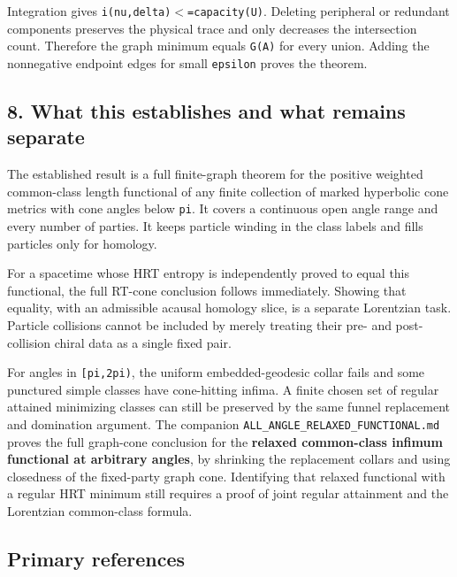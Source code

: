 \documentclass[11pt]{article}
\renewcommand{\textless}{\ensuremath{<}}
\begin{document}
Integration gives \texttt{i(nu,delta)\textless{}=capacity(U)}. Deleting
peripheral or redundant components preserves the physical trace and only
decreases the intersection count. Therefore the graph minimum equals
\texttt{G(A)} for every union. Adding the nonnegative endpoint edges for
small \texttt{epsilon} proves the theorem.

\subsection{8. What this establishes and what remains
separate}\label{what-this-establishes-and-what-remains-separate}

The established result is a full finite-graph theorem for the positive
weighted common-class length functional of any finite collection of
marked hyperbolic cone metrics with cone angles below \texttt{pi}. It
covers a continuous open angle range and every number of parties. It
keeps particle winding in the class labels and fills particles only for
homology.

For a spacetime whose HRT entropy is independently proved to equal this
functional, the full RT-cone conclusion follows immediately. Showing
that equality, with an admissible acausal homology slice, is a separate
Lorentzian task. Particle collisions cannot be included by merely
treating their pre- and post-collision chiral data as a single fixed
pair.

For angles in \texttt{{[}pi,2pi)}, the uniform embedded-geodesic collar
fails and some punctured simple classes have cone-hitting infima. A
finite chosen set of regular attained minimizing classes can still be
preserved by the same funnel replacement and domination argument. The
companion \texttt{ALL\_\allowbreak ANGLE\_\allowbreak RELAXED\_\allowbreak FUNCTIONAL.md} proves the full
graph-cone conclusion for the \textbf{relaxed common-class infimum
functional at arbitrary angles}, by shrinking the replacement collars
and using closedness of the fixed-party graph cone. Identifying that
relaxed functional with a regular HRT minimum still requires a proof of
joint regular attainment and the Lorentzian common-class formula.

\subsection{Primary references}\label{primary-references}
\end{document}
